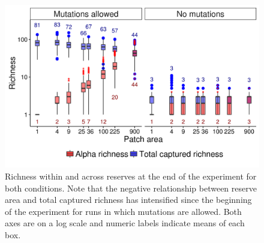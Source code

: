 \documentclass[letterpaper]{article}
\begin{document}
\begin{figure}[h]
	\centering
	\includegraphics[]{CapturedRichnessEnd.png}
    \caption{Richness within and across reserves at the end of the experiment for both conditions. Note that the negative relationship between reserve area and total captured richness has intensified since the beginning of the experiment for runs in which mutations are allowed. Both axes are on a log scale and numeric labels indicate means of each box.}
    \label{fig:capturedrichnessend}
\end{figure}
%
%
%
%
%
%
%
%
%
%
%
%
%
%
\end{document}
